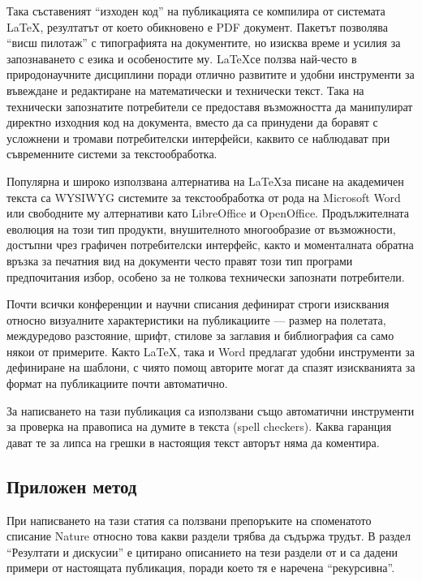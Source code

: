 \documentclass[11pt, oneside]{article}     %
\begin{document}
Така съставеният ``изходен код'' на публикацията се компилира от системата \LaTeX, резултатът от което обикновено е PDF документ. Пакетът позволява ``висш пилотаж'' с типографията на документите, но изисква време и усилия за запознаването с езика и особеностите му. \LaTeX се ползва най-често в природонаучните дисциплини поради отлично развитите и удобни инструменти за въвеждане и редактиране на математически и технически текст. Така на технически запознатите потребители се предоставя възможността да манипулират директно изходния код на документа, вместо да са принудени да боравят с усложнени и тромави потребителски интерфейси, каквито се наблюдават при съвременните системи за текстообработка.

Популярна и широко използвана алтернатива на \LaTeX за писане на академичен текста са WYSIWYG системите за текстообработка от рода на Microsoft Word или свободните му алтернативи като LibreOffice и Open\-Office. Продължителната еволюция на този тип продукти, внушителното многообразие от възможности, достъпни чрез графичен потребителски интерфейс, както и моменталната обратна връзка за печатния вид на документи често правят този тип програми предпочитания избор, особено за не толкова технически запознати потребители.

Почти всички конференции и научни списания дефинират строги изисквания относно визуалните характеристики на публикациите --- размер на полетата, междуредово разстояние, шрифт, стилове за заглавия и библиография са само някои от примерите. Както \LaTeX, така и Word предлагат удобни инструменти за дефиниране на шаблони, с чиято помощ авторите могат да спазят изискванията за формат на публикациите почти автоматично.

За написването на тази публикация са използвани също автоматични инструменти за проверка на правописа на думите в текста (spell checkers). Каква гаранция дават те за липса на грешки в настоящия текст авторът няма да коментира.

\subsection*{Приложен метод}

При написването на тази статия са ползвани препоръките на споменатото списание Nature \cite{nature} относно това какви раздели трябва да съдържа трудът. В раздел ``Резултати и дискусии'' е цитирано описанието на тези раздели от \cite{nature} и са дадени примери от настоящата публикация, поради което тя е наречена ``рекурсивна''.
\end{document}
